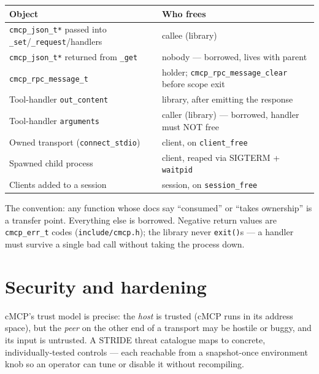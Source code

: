 \documentclass[10pt]{article}
\newcommand{\code}[1]{\texttt{\small #1}}
\begin{document}
\begin{center}\small
\begin{tabular}{l l}
\toprule
Object & Who frees \\
\midrule
\code{cmcp\_json\_t*} passed into \code{*\_set}/\code{*\_request}/handlers & callee (library) \\
\code{cmcp\_json\_t*} returned from \code{*\_get} & nobody --- borrowed, lives with parent \\
\code{cmcp\_rpc\_message\_t} & holder; \code{cmcp\_rpc\_message\_clear} before scope exit \\
Tool-handler \code{*out\_content} & library, after emitting the response \\
Tool-handler \code{arguments} & caller (library) --- borrowed, handler must NOT free \\
Owned transport (\code{connect\_stdio}) & client, on \code{client\_free} \\
Spawned child process & client, reaped via SIGTERM + \code{waitpid} \\
Clients added to a session & session, on \code{session\_free} \\
\bottomrule
\end{tabular}
\end{center}

The convention: any function whose docs say ``consumed'' or ``takes ownership''
is a transfer point. Everything else is borrowed. Negative return values are
\code{cmcp\_err\_t} codes (\code{include/cmcp.h}); the library never \code{exit()}s
--- a handler must survive a single bad call without taking the process down.

\section{Security and hardening}

cMCP's trust model is precise: the \emph{host} is trusted (cMCP runs in its
address space), but the \emph{peer} on the other end of a transport may be hostile
or buggy, and its input is untrusted. A STRIDE threat catalogue maps to concrete,
individually-tested controls --- each reachable from a snapshot-once environment
knob so an operator can tune or disable it without recompiling.
\end{document}
